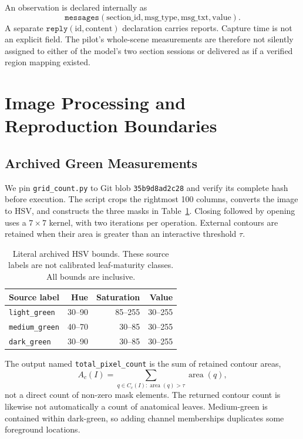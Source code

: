 \documentclass[runningheads]{llncs}
\newcommand{\code}[1]{\texttt{#1}}
\begin{document}
An observation is declared internally as
\begin{equation}
\code{messages}(\mathrm{section\_id},\mathrm{msg\_type},\mathrm{msg\_txt},\mathrm{value}).
\end{equation}
A separate $\code{reply}(\mathrm{id},\mathrm{content})$ declaration carries reports. Capture time is not an explicit field. The pilot's whole-scene measurements are therefore not silently assigned to either of the model's two section sessions or delivered as if a verified region mapping existed.

\section{Image Processing and Reproduction Boundaries}
\label{sec:implementation}
\subsection{Archived Green Measurements}
We pin \code{grid\_count.py} to Git blob \code{35b9d8ad2c28} and verify its complete hash before execution. The script crops the rightmost 100 columns, converts the image to HSV, and constructs the three masks in Table~\ref{tab:ranges}. Closing followed by opening uses a $7\times7$ kernel, with two iterations per operation. External contours are retained when their area is greater than an interactive threshold $\tau$.

\begin{table}[t]
\caption{Literal archived HSV bounds. These source labels are not calibrated leaf-maturity classes. All bounds are inclusive.}
\label{tab:ranges}
\centering
\begin{tabular}{lrrr}
\toprule
Source label & Hue & Saturation & Value\\
\midrule
\code{light\_green} & 30--90 & 85--255 & 30--255\\
\code{medium\_green} & 40--70 & 30--85 & 30--255\\
\code{dark\_green} & 30--90 & 30--85 & 30--255\\
\bottomrule
\end{tabular}
\end{table}

The output named \code{total\_pixel\_count} is the sum of retained contour areas,
\begin{equation}
 A_c(I)=\sum_{q\in C_c(I):\operatorname{area}(q)>\tau}\operatorname{area}(q),
\end{equation}
not a direct count of non-zero mask elements. The returned contour count is likewise not automatically a count of anatomical leaves. Medium-green is contained within dark-green, so adding channel memberships duplicates some foreground locations.
\end{document}
